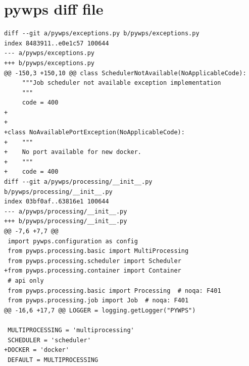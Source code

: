\documentclass[12pt,a4paper]{article}
\begin{document}
\newpage
\section{pywps diff file}
\begin{lstlisting}[basicstyle=\small,caption={pywps diff file}]
diff --git a/pywps/exceptions.py b/pywps/exceptions.py
index 8483911..e0e1c57 100644
--- a/pywps/exceptions.py
+++ b/pywps/exceptions.py
@@ -150,3 +150,10 @@ class SchedulerNotAvailable(NoApplicableCode):
     """Job scheduler not available exception implementation
     """
     code = 400
+
+
+class NoAvailablePortException(NoApplicableCode):
+    """
+    No port available for new docker.
+    """
+    code = 400
diff --git a/pywps/processing/__init__.py b/pywps/processing/__init__.py
index 03bf0af..63816e1 100644
--- a/pywps/processing/__init__.py
+++ b/pywps/processing/__init__.py
@@ -7,6 +7,7 @@
 import pywps.configuration as config
 from pywps.processing.basic import MultiProcessing
 from pywps.processing.scheduler import Scheduler
+from pywps.processing.container import Container
 # api only
 from pywps.processing.basic import Processing  # noqa: F401
 from pywps.processing.job import Job  # noqa: F401
@@ -16,6 +17,7 @@ LOGGER = logging.getLogger("PYWPS")
 
 MULTIPROCESSING = 'multiprocessing'
 SCHEDULER = 'scheduler'
+DOCKER = 'docker'
 DEFAULT = MULTIPROCESSING
 

\end{lstlisting}
\end{document}
